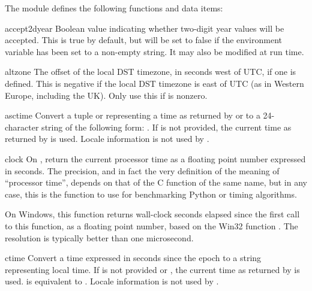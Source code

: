 The module defines the following functions and data items:


\begin{datadesc}{accept2dyear}
Boolean value indicating whether two-digit year values will be
accepted.  This is true by default, but will be set to false if the
environment variable  has been set to a non-empty
string.  It may also be modified at run time.
\end{datadesc}

\begin{datadesc}{altzone}
The offset of the local DST timezone, in seconds west of UTC, if one
is defined.  This is negative if the local DST timezone is east of UTC
(as in Western Europe, including the UK).  Only use this if
 is nonzero.
\end{datadesc}

\begin{funcdesc}{asctime}{}
Convert a tuple or  representing a time as returned
by 
or  to a 24-character string of the following form:
.  If  is not provided, the
current time as returned by  is used.
Locale information is not used by .
\end{funcdesc}

\begin{funcdesc}{clock}{}
On \UNIX, return
the current processor time as a floating point number expressed in
seconds.  The precision, and in fact the very definition of the meaning
of ``processor time'', depends
on that of the C function of the same name, but in any case, this is
the function to use for benchmarking Python or
timing algorithms.

On Windows, this function returns wall-clock seconds elapsed since the
first call to this function, as a floating point number,
based on the Win32 function .
The resolution is typically better than one microsecond.
\end{funcdesc}

\begin{funcdesc}{ctime}{}
Convert a time expressed in seconds since the epoch to a string
representing local time. If  is not provided or
, the current time as returned by  is
used.   is equivalent to
.
Locale information is not used by .
\end{funcdesc}

